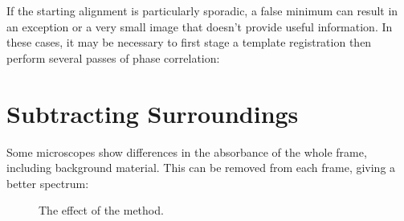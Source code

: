 \documentclass[letterpaper,10pt,english]{sphinxmanual}
\begin{document}
If the starting alignment is particularly sporadic, a false minimum
can result in an exception or a very small image that doesn’t provide
useful information. In these cases, it may be necessary to first stage
a template registration then perform several passes of phase
correlation:

\begin{sphinxVerbatim}[commandchars=\\\{\}]
  
  \PYG{p}{[}  \PYG{p}{]}
 


  
 
\end{sphinxVerbatim}


\section{Subtracting Surroundings}
\label{\detokenize{analysis:subtracting-surroundings}}
Some microscopes show differences in the absorbance of the whole
frame, including background material. This can be removed from each
frame, giving a better spectrum:

\begin{sphinxVerbatim}[commandchars=\\\{\}]
  
\end{sphinxVerbatim}
\begin{figure}[htbp]
\centering
\capstart

\noindent{}
\caption{The effect of the  method.}\label{\detokenize{analysis:id2}}\end{figure}
\end{document}
